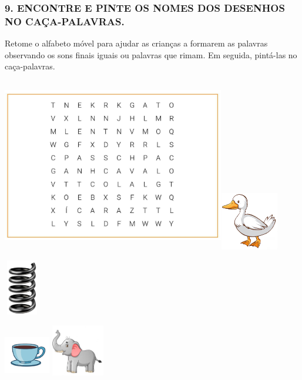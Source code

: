 \subsubsection{9. ENCONTRE E PINTE OS NOMES DOS DESENHOS NO CAÇA-PALAVRAS.}\label{encontre-e-pinte-no-cauxe7a-palavras-os-nomes-dos-desenhos.}

\protect\hypertarget{_heading=h.1fob9te}{}{}Retome o alfabeto móvel para
ajudar as crianças a formarem as palavras observando os sons
finais iguais ou palavras que rimam. Em seguida, pintá-las no caça-palavras.

\includegraphics[width=3.83611in,height=2.98958in]{media/image29.jpg}\includegraphics[width=1.00625in,height=0.99857in]{media/image30.png}

\includegraphics[width=0.61042in,height=0.95923in]{media/image31.png}

\includegraphics[width=0.78750in,height=0.70972in]{media/image32.png}\includegraphics[width=1.02361in,height=0.88333in]{media/image33.png}

